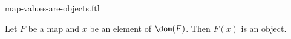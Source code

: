 \documentclass{stex}
\begin{document}
\begin{smodule}{map-values-are-objects.ftl}
  \begin{forthel}
    \begin{lemma}
      Let $F$ be a map and $x$ be an element of $\dom(F)$.
      Then $F(x)$ is an object.
    \end{lemma}
  \end{forthel}
\end{smodule}
\end{document}
